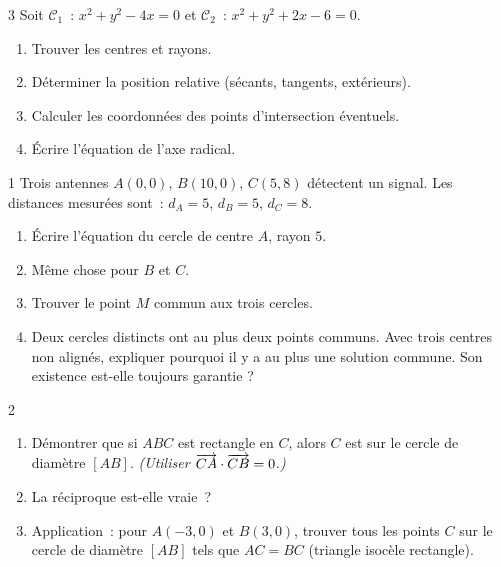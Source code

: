 \begin{probleme}{3}
Soit $\mathcal{C}_1$~: $x^2+y^2-4x=0$ et $\mathcal{C}_2$~: $x^2+y^2+2x-6=0$.
\begin{enumerate}
  \item Trouver les centres et rayons.
  \item D\'eterminer la position relative (s\'ecants, tangents, ext\'erieurs).
  \item Calculer les coordonn\'ees des points d'intersection \'eventuels.
  \item \'Ecrire l'\'equation de l'axe radical.
\end{enumerate}
\end{probleme}

\begin{probleme}{1}
Trois antennes $A(0,0)$, $B(10,0)$, $C(5,8)$ d\'etectent un signal.
Les distances mesur\'ees sont~: $d_A=5$, $d_B=5$, $d_C=8$.
\begin{enumerate}
  \item \'Ecrire l'\'equation du cercle de centre $A$, rayon $5$.
  \item M\^eme chose pour $B$ et $C$.
  \item Trouver le point $M$ commun aux trois cercles.
  \item Deux cercles distincts ont au plus deux points communs.
        Avec trois centres non align\'es, expliquer pourquoi il y a au plus
        une solution commune. Son existence est-elle toujours garantie ?
\end{enumerate}
\end{probleme}

\begin{probleme}{2}
\begin{enumerate}
  \item D\'emontrer que si $ABC$ est rectangle en $C$, alors $C$ est sur le cercle
        de diam\`etre $[AB]$.
        \emph{(Utiliser $\overrightarrow{CA}\cdot\overrightarrow{CB}=0$.)}
  \item La r\'eciproque est-elle vraie~?
  \item Application~: pour $A(-3,0)$ et $B(3,0)$, trouver tous les points $C$
        sur le cercle de diam\`etre $[AB]$ tels que $AC=BC$ (triangle isoc\`ele rectangle).
\end{enumerate}
\end{probleme}

